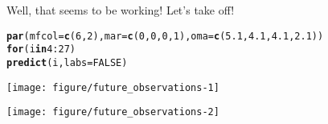 \documentclass[11pt]{article}\usepackage[]{graphicx}\usepackage[]{color}
\makeatletter
\def\maxwidth{ %
  \ifdim\Gin@nat@width>\linewidth
    \linewidth
  \else
    \Gin@nat@width
  \fi
}
\newcommand{\hlnum}[1]{\textcolor[rgb]{0.686,0.059,0.569}{#1}}%
\newcommand{\hlopt}[1]{\textcolor[rgb]{0,0,0}{#1}}%
\newcommand{\hlstd}[1]{\textcolor[rgb]{0.345,0.345,0.345}{#1}}%
\newcommand{\hlkwa}[1]{\textcolor[rgb]{0.161,0.373,0.58}{\textbf{#1}}}%
\newcommand{\hlkwc}[1]{\textcolor[rgb]{0.333,0.667,0.333}{#1}}%
\newcommand{\hlkwd}[1]{\textcolor[rgb]{0.737,0.353,0.396}{\textbf{#1}}}%
\newenvironment{kframe}{%
 \def\at@end@of@kframe{}%
 \ifinner\ifhmode%
  \def\at@end@of@kframe{\end{minipage}}%
  \begin{minipage}{\columnwidth}%
 \fi\fi%
 \def\FrameCommand##1{\hskip\@totalleftmargin \hskip-\fboxsep
 \colorbox{shadecolor}{##1}\hskip-\fboxsep
     \hskip-\linewidth \hskip-\@totalleftmargin \hskip\columnwidth}%
 \MakeFramed {\advance\hsize-\width
   \@totalleftmargin\z@ \linewidth\hsize
   \@setminipage}}%
 {\par\unskip\endMakeFramed%
 \at@end@of@kframe}
\newenvironment{knitrout}{}{} %
\makeatother
\begin{document}
Well, that seems to be working! Let's take off!
\begin{knitrout}
\color{fgcolor}\begin{kframe}
\begin{alltt}
\hlkwd{par}\hlstd{(}\hlkwc{mfcol} \hlstd{=} \hlkwd{c}\hlstd{(}\hlnum{6}\hlstd{,} \hlnum{2}\hlstd{),} \hlkwc{mar} \hlstd{=} \hlkwd{c}\hlstd{(}\hlnum{0}\hlstd{,} \hlnum{0}\hlstd{,} \hlnum{0}\hlstd{,} \hlnum{1}\hlstd{),} \hlkwc{oma} \hlstd{=} \hlkwd{c}\hlstd{(}\hlnum{5.1}\hlstd{,} \hlnum{4.1}\hlstd{,} \hlnum{4.1}\hlstd{,} \hlnum{2.1}\hlstd{))}
\hlkwa{for} \hlstd{(i} \hlkwa{in} \hlnum{4}\hlopt{:}\hlnum{27}\hlstd{)}
    \hlkwd{predict}\hlstd{(i,} \hlkwc{labs} \hlstd{=} \hlnum{FALSE}\hlstd{)}
\end{alltt}
\end{kframe}
\texttt{[image: figure/future\_observations-1]} 

\texttt{[image: figure/future\_observations-2]} 

\end{knitrout}
\end{document}
